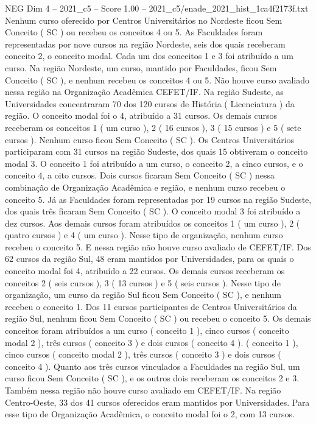 \begin{textsample}{NEG Dim 4 – 2021\_c5 – Score 1.00 – 2021\_c5/enade\_2021\_hist\_1ca4f2173f.txt}
Nenhum curso oferecido por Centros Universitários no Nordeste ficou Sem Conceito ( SC ) ou recebeu os conceitos 4 ou 5.
As Faculdades foram representadas por nove cursos na região Nordeste, seis dos quais receberam conceito 2, o conceito modal.
Cada um dos conceitos 1 e 3 foi atribuído a um curso.
Na região Nordeste, um curso, mantido por Faculdades, ficou Sem Conceito ( SC ), e nenhum recebeu os conceitos 4 ou 5.
Não houve curso avaliado nessa região na Organização Acadêmica CEFET/IF.
Na região Sudeste, as Universidades concentraram 70 dos 120 cursos de História ( Licenciatura ) da região.
O conceito modal foi o 4, atribuído a 31 cursos.
Os demais cursos receberam os conceitos 1 ( um curso ), 2 ( 16 cursos ), 3 ( 15 cursos ) e 5 ( sete cursos ).
Nenhum curso ficou Sem Conceito ( SC ).
Os Centros Universitários participaram com 31 cursos na região Sudeste, dos quais 15 obtiveram o conceito modal 3.
O conceito 1 foi atribuído a um curso, o conceito 2, a cinco cursos, e o conceito 4, a oito cursos.
Dois cursos ficaram Sem Conceito ( SC ) nessa combinação de Organização Acadêmica e região, e nenhum curso recebeu o conceito 5.
Já as Faculdades foram representadas por 19 cursos na região Sudeste, dos quais três ficaram Sem Conceito ( SC ).
O conceito modal 3 foi atribuído a dez cursos.
Aos demais cursos foram atribuídos os conceitos 1 ( um curso ), 2 ( quatro cursos ) e 4 ( um curso ).
Nesse tipo de organização, nenhum curso recebeu o conceito 5.
E nessa região não houve curso avaliado de CEFET/IF.
Dos 62 cursos da região Sul, 48 eram mantidos por Universidades, para os quais o conceito modal foi 4, atribuído a 22 cursos.
Os demais cursos receberam os conceitos 2 ( seis cursos ), 3 ( 13 cursos ) e 5 ( seis cursos ).
Nesse tipo de organização, um curso da região Sul ficou Sem Conceito ( SC ), e nenhum recebeu o conceito 1.
Dos 11 cursos participantes de Centros Universitários da região Sul, nenhum ficou Sem Conceito ( SC ) ou recebeu o conceito 5.
Os demais conceitos foram atribuídos a um curso ( conceito 1 ), cinco cursos ( conceito modal 2 ), três cursos ( conceito 3 ) e dois cursos ( conceito 4 ). ( conceito 1 ), cinco cursos ( conceito modal 2 ), três cursos ( conceito 3 ) e dois cursos ( conceito 4 ).
Quanto aos três cursos vinculados a Faculdades na região Sul, um curso ficou Sem Conceito ( SC ), e os outros dois receberam os conceitos 2 e 3.
Também nessa região não houve curso avaliado em CEFET/IF.
Na região Centro-Oeste, 33 dos 41 cursos oferecidos eram mantidos por Universidades.
Para esse tipo de Organização Acadêmica, o conceito modal foi o 2, com 13 cursos.

\end{textsample}
